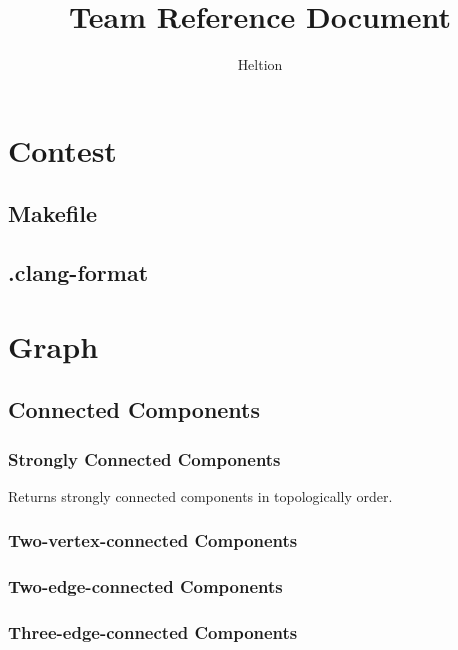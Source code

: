 \documentclass{article}
\begin{document}
\title{Team Reference Document}
\author{Heltion}
\maketitle
\newpage
\begin{multicols}{2}
    \tableofcontents
    \newpage
    \setcounter{page}{1}
    \scriptsize

    \section{Contest}
    \subsection{Makefile}
    
    \subsection{.clang-format}
    

    \section{Graph}
    \subsection{Connected Components}
    \subsubsection{Strongly Connected Components}
    Returns strongly connected components in topologically order.
    

    \subsubsection{Two-vertex-connected Components}
    

    \subsubsection{Two-edge-connected Components}
    

    \subsubsection{Three-edge-connected Components}
    


\end{multicols}
\end{document}
